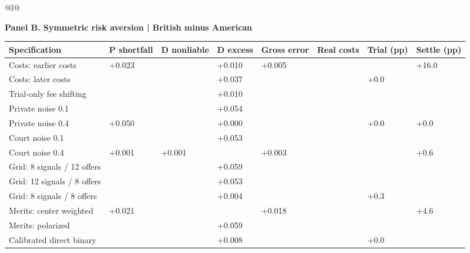 \documentclass[10pt,border=5pt]{standalone}
\begin{document}
\begin{tabular}{@{}l@{}}
\\[12pt]
\noalign{\vskip 4pt}
\begin{minipage}{18.400cm}
\small
\setlength{\tabcolsep}{3pt}
\renewcommand{\arraystretch}{1.25}
\noindent\textbf{Panel B. Symmetric risk aversion | British minus American}\par\smallskip
\begin{tabular}{@{}>{\raggedright\arraybackslash}p{5.454cm}>{\centering\arraybackslash}p{1.632cm}>{\centering\arraybackslash}p{1.632cm}>{\centering\arraybackslash}p{1.567cm}>{\centering\arraybackslash}p{1.567cm}>{\centering\arraybackslash}p{1.567cm}>{\centering\arraybackslash}p{1.610cm}>{\centering\arraybackslash}p{1.610cm}@{}}
\toprule
\textbf{Specification} & \textbf{P shortfall} & \textbf{D nonliable} & \textbf{D excess} & \textbf{Gross error} & \textbf{Real costs} & \textbf{Trial (pp)} & \textbf{Settle (pp)}\\\midrule
Costs: earlier costs & +0.023 & -0.041 & +0.010 & +0.005 & -0.015 & -7.7 & +16.0\\
Costs: later costs & -0.077 & -0.084 & +0.037 & -0.116 & -0.056 & +0.0 & -80.7\\
Trial-only fee shifting & -0.082 & -0.093 & +0.010 & -0.119 & -0.138 & -0.8 & -84.8\\
Private noise 0.1 & -0.088 & -0.116 & +0.054 & -0.076 & -0.217 & -0.8 & -96.1\\
Private noise 0.4 & +0.050 & -0.050 & +0.000 & -0.000 & -0.000 & +0.0 & +0.0\\
Court noise 0.1 & -0.087 & -0.099 & +0.053 & -0.064 & -0.194 & -7.8 & -82.1\\
Court noise 0.4 & +0.001 & +0.001 & -0.000 & +0.003 & -0.002 & -0.6 & +0.6\\
Grid: 8 signals / 12 offers & -0.132 & -0.081 & +0.059 & -0.103 & -0.170 & -1.8 & -87.5\\
Grid: 12 signals / 8 offers & -0.093 & -0.109 & +0.053 & -0.079 & -0.198 & -6.9 & -83.9\\
Grid: 8 signals / 8 offers & -0.026 & -0.143 & +0.004 & -0.108 & -0.109 & +0.3 & -47.4\\
Merits: center weighted & +0.021 & -0.010 & -0.004 & +0.018 & -0.014 & -4.6 & +4.6\\
Merits: polarized & -0.108 & -0.114 & +0.059 & -0.090 & -0.205 & -5.7 & -88.1\\
Calibrated direct binary & -0.081 & -0.081 & +0.008 & -0.151 & -0.000 & +0.0 & -4.0\\
\bottomrule\end{tabular}

\end{minipage}
\end{tabular}
\end{document}
